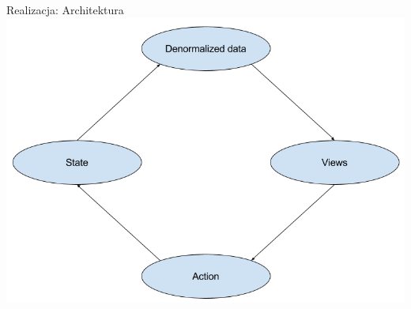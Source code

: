 \documentclass[presentation]{beamer}
\begin{document}
\begin{frame}[label=sec-3-3]{Realizacja: Architektura}
\includegraphics[width=.9\linewidth]{./img/Oneway.png}
\end{frame}
\end{document}
